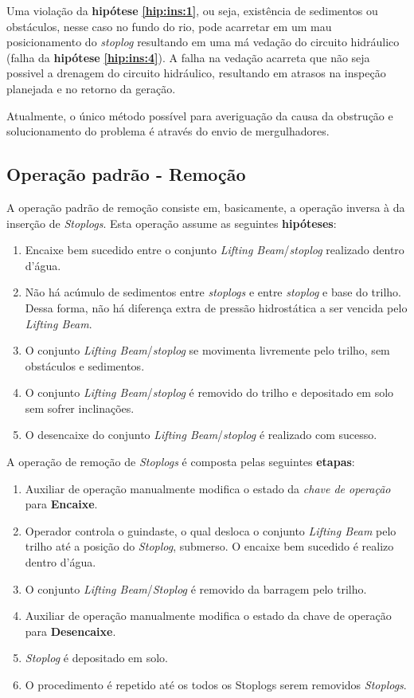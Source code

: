 Uma violação da \textbf{hipótese} \textbf{\ref{hip:ins:1}}, ou seja, existência
de sedimentos ou obstáculos, nesse caso no fundo do rio, pode acarretar em um mau posicionamento do
\emph{stoplog} resultando em uma má vedação do circuito hidráulico (falha da \textbf{hipótese} \textbf{\ref{hip:ins:4}}).  A falha na vedação acarreta que não seja possivel a drenagem do circuito hidráulico, resultando em atrasos na inspeção planejada e no retorno da geração. 

Atualmente, o único método possível para averiguação da causa da obstrução e solucionamento do problema é através do envio de mergulhadores.  




\subsection{Operação padrão - Remoção}
A operação padrão de remoção consiste em, basicamente, a operação inversa à da inserção de \emph{Stoplogs}. Esta operação assume as seguintes \textbf{hipóteses}:

\begin{enumerate}
\item Encaixe bem sucedido entre o conjunto \emph{Lifting Beam}/\emph{stoplog}
realizado dentro d'água.
\item Não há acúmulo de sedimentos entre \emph{stoplogs} e entre \emph{stoplog} e base do trilho. Dessa forma, não há diferença extra de pressão hidrostática a ser vencida pelo \emph{Lifting Beam}.
\label{hip:rem:2}
\item O conjunto \emph{Lifting Beam}/\emph{stoplog} se movimenta livremente pelo trilho, sem obstáculos e sedimentos.
\item O conjunto \emph{Lifting Beam}/\emph{stoplog} é removido do trilho e depositado em solo sem sofrer inclinações.  
\item O desencaixe do conjunto \emph{Lifting Beam}/\emph{stoplog} é realizado com sucesso.
\end{enumerate}

A operação de remoção de \emph{Stoplogs} é composta pelas seguintes \textbf{etapas}:
\begin{enumerate}
\item Auxiliar de operação manualmente modifica o estado da \emph{chave de operação} para \textbf{Encaixe}.
\item Operador controla o guindaste, o qual desloca o conjunto \emph{Lifting Beam} pelo trilho até a posição do \emph{Stoplog}, submerso. O encaixe bem sucedido é realizo dentro d'água.
\item O conjunto \emph{Lifting Beam}/\emph{Stoplog} é removido da barragem pelo trilho. 
\item Auxiliar de operação manualmente modifica o estado da chave de operação para \textbf{Desencaixe}.
\item \emph{Stoplog} é depositado em solo.
\item O procedimento é repetido até os todos os Stoplogs serem removidos \emph{Stoplogs}.
\end{enumerate}

